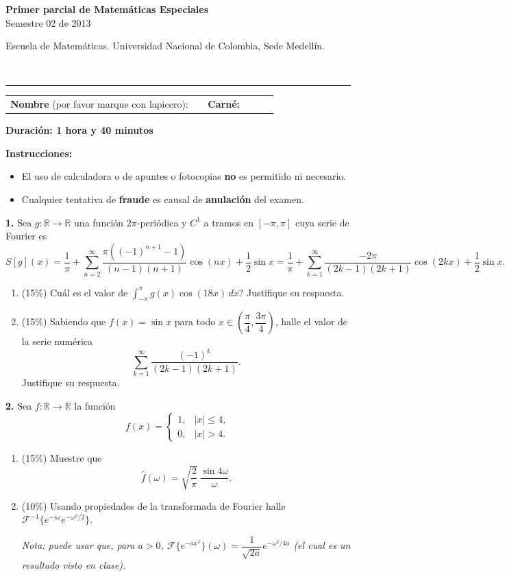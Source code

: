 \documentclass[11pt]{article}
\newcommand{\examheader}{%
  \noindent
  \begin{minipage}[t]{0.6\linewidth}
    {\small\bfseries Primer parcial de Matem\'aticas Especiales}\\
    {\small Semestre 02 de 2013}
  \end{minipage}%
  \hfill
  \begin{minipage}[t]{0.35\linewidth}
    \raggedleft\small Escuela de Matem\'aticas. Universidad Nacional de Colombia, Sede Medell\'in.
  \end{minipage}\\[2pt]
  \rule{\linewidth}{0.6pt}
}
\begin{document}
\examheader

\vspace{6pt}
\noindent
\begin{tabular}{@{}p{0.7\linewidth}p{0.25\linewidth}@{}}
\textbf{Nombre} (por favor marque con lapicero): \dotfill & \textbf{Carn\'e:} \dotfill
\end{tabular}

\begin{center}
\textbf{Duraci\'on: 1 hora y 40 minutos}
\end{center}

\textbf{Instrucciones:}
\begin{itemize}[itemsep=1pt, topsep=2pt, leftmargin=1.5em]
  \item El uso de calculadora o de apuntes o fotocopias \textbf{no} es permitido ni necesario.
  \item Cualquier tentativa de \textbf{fraude} es causal de \textbf{anulaci\'on} del examen.
\end{itemize}

\vspace{6pt}
\textbf{1.} Sea $g:\mathbb{R}\longrightarrow\mathbb{R}$ una funci\'on $2\pi$-peri\'odica y $C^1$ a tramos en $[-\pi,\pi]$ cuya serie de Fourier es
\[
S[g](x) = \frac{1}{\pi} + \sum_{n=2}^{\infty} \frac{\pi((-1)^{n+1}-1)}{(n-1)(n+1)}\cos(nx) + \frac{1}{2}\sin x = \frac{1}{\pi} + \sum_{k=1}^{\infty} \frac{-2\pi}{(2k-1)(2k+1)}\cos(2kx) + \frac{1}{2}\sin x.
\]

\begin{enumerate}[label=\alph*), itemsep=4pt, topsep=4pt, leftmargin=1.8em]
  \item (15\%) \textquestiondown Cu\'al es el valor de $\displaystyle\int_{-\pi}^{\pi} g(x)\cos(18x)\,dx$? Justifique su respuesta.
  \item (15\%) Sabiendo que $f(x) = \sin x$ para todo $x\in\left(\dfrac{\pi}{4},\dfrac{3\pi}{4}\right)$, halle el valor de la serie num\'erica
  \[
  \sum_{k=1}^{\infty} \frac{(-1)^k}{(2k-1)(2k+1)}.
  \]
  Justifique su respuesta.
\end{enumerate}

\vspace{6pt}
\textbf{2.} Sea $f:\mathbb{R}\longrightarrow\mathbb{R}$ la funci\'on
\[
f(x) = \begin{cases} 1, & |x|\leq 4, \\ 0, & |x|>4. \end{cases}
\]

\begin{enumerate}[label=\alph*), itemsep=4pt, topsep=4pt, leftmargin=1.8em]
  \item (15\%) Muestre que
  \[
  \widehat{f}(\omega) = \sqrt{\frac{2}{\pi}}\,\frac{\sin 4\omega}{\omega}.
  \]
  \item (10\%) Usando propiedades de la transformada de Fourier halle $\mathcal{F}^{-1}\{e^{-i\omega}e^{-\omega^2/2}\}$.

  \textit{Nota: puede usar que, para $a>0$, $\mathcal{F}\{e^{-ax^2}\}(\omega) = \dfrac{1}{\sqrt{2a}}e^{-\omega^2/4a}$ (el cual es un resultado visto en clase).}
\end{enumerate}
\end{document}
